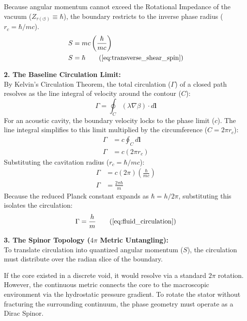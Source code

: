 Because angular momentum cannot exceed the Rotational Impedance of the vacuum ($Z_{\tau(\circlearrowleft)} \equiv \hbar$), the boundary restricts to the inverse phase radius ($r_c = \hbar / mc$). 
\begin{align}
    S &= m c \left( \frac{\hbar}{mc} \right) \nonumber \\
    S &= \hbar \tag{\ref{eq:transverse_shear_spin}}
\end{align}

\textbf{2. The Baseline Circulation Limit:} \\
By Kelvin's Circulation Theorem, the total circulation ($\Gamma$) of a closed path resolves as the line integral of velocity around the contour ($C$): 
\begin{equation}
    \Gamma = \oint_C (\lambda \nabla \beta) \cdot d\mathbf{l} 
\end{equation}
For an acoustic cavity, the boundary velocity locks to the phase limit ($c$). The line integral simplifies to this limit multiplied by the circumference ($C = 2\pi r_c$): 
\begin{align}
    \Gamma &= c \oint_C d\mathbf{l}  \\
    \Gamma &= c (2\pi r_c) 
\end{align}
Substituting the cavitation radius ($r_c = \hbar / mc$): 
\begin{align}
    \Gamma &= c (2\pi) \left( \frac{\hbar}{m c} \right)  \\
    \Gamma &= \frac{2\pi \hbar}{m} 
\end{align}
Because the reduced Planck constant expands as $\hbar = h / 2\pi$, substituting this isolates the circulation:
\begin{equation}
    \Gamma = \frac{h}{m} \tag{\ref{eq:fluid_circulation}}
\end{equation}

\textbf{3. The Spinor Topology ($4\pi$ Metric Untangling):} \\
To translate circulation into quantized angular momentum ($S$), the circulation must distribute over the radian slice of the boundary. 

If the core existed in a discrete void, it would resolve via a standard $2\pi$ rotation. However, the continuous metric connects the core to the macroscopic environment via the hydrostatic pressure gradient. To rotate the stator without fracturing the surrounding continuum, the phase geometry must operate as a Dirac Spinor. 


